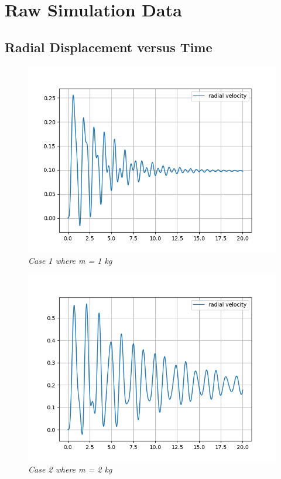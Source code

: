 \chapter{{Raw Simulation Data}}\label{rawsim}
        
    \section{{Radial Displacement versus Time}}
            
        \begin{figure}[H]
            \centering
            \includegraphics{Appendix/RSimPictures/R/rm1.png}
            \caption{\textit{Case 1 where m = 1 kg}}
            \label{}
        \end{figure}
            
        \begin{figure}[H]
            \centering
            \includegraphics{Appendix/RSimPictures/R/rm2.png}
            \caption{\textit{Case 2 where m = 2 kg}}
            \label{}
        \end{figure}
            
